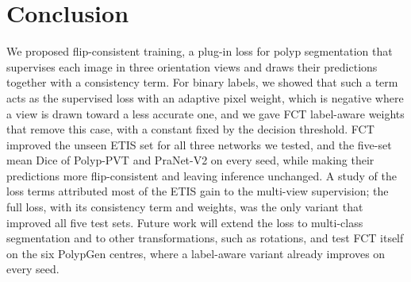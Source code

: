 \section{Conclusion}
\label{sec:conclusion}

We proposed flip-consistent training, a plug-in loss for polyp segmentation that supervises each image
in three orientation views and draws their predictions together with a consistency term. For binary
labels, we showed that such a term acts as the supervised loss with an adaptive pixel weight, which is
negative where a view is drawn toward a less accurate one, and we gave FCT label-aware weights that
remove this case, with a constant fixed by the decision threshold. FCT improved the unseen ETIS set for
all three networks we tested, and the five-set mean Dice of Polyp-PVT and PraNet-V2 on every seed,
while making their predictions more flip-consistent and leaving inference unchanged. A study of the loss
terms attributed most of the ETIS gain to the multi-view supervision; the full loss, with its
consistency term and weights, was the only variant that improved all five test sets. Future work will extend the
loss to multi-class segmentation and to other transformations, such as rotations, and test FCT itself on
the six PolypGen centres, where a label-aware variant already improves on every seed.

